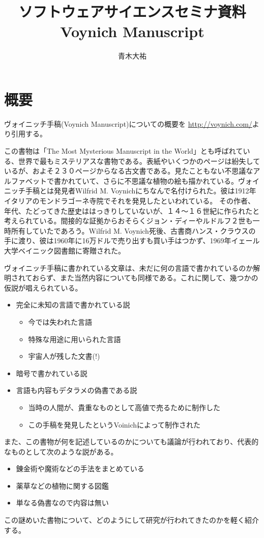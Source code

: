 \documentclass[a4paper,7pt]{jsarticle}
\author{青木大祐}
\title{ソフトウェアサイエンスセミナ資料 \\ Voynich Manuscript}
\begin{document}
\maketitle
\section{概要}

ヴォイニッチ手稿(Voynich Manuscript)についての概要を
\url{http://voynich.com/}より引用する。
\begin{screen}
 この書物は「The Most Mysterious Manuscript in the World」とも呼ばれている、世界で最もミステリアスな書物である。表紙やいくつかのページは紛失しているが、およそ２３０ページからなる古文書である。見たこともない不思議なアルファベットで書かれていて、さらに不思議な植物の絵も描かれている。ヴォイニッチ手稿とは発見者Wilfrid M. Voynichにちなんで名付けられた。彼は1912年イタリアのモンドラゴーネ寺院でそれを発見したといわれている。 その作者、年代、たどってきた歴史ははっきりしていないが、１４～１６世紀に作られたと考えられている。間接的な証拠からおそらくジョン・ディーやルドルフ２世も一時所有していたであろう。Wilfrid M. Voynich死後、古書商ハンス・クラウスの手に渡り、彼は1960年に16万ドルで売り出すも買い手はつかず、1969年イェール大学ベイニック図書館に寄贈された。 
\end{screen}
ヴォイニッチ手稿に書かれている文章は、未だに何の言語で書かれているのか解
明されておらず、また当然内容についても同様である。これに関して、幾つかの
仮説が唱えられている。
\begin{itemize}
 \item 完全に未知の言語で書かれている説
       \begin{itemize}
        \item 今では失われた言語
        \item 特殊な用途に用いられた言語
        \item 宇宙人が残した文書(!)
       \end{itemize}
 \item 暗号で書かれている説
 \item 言語も内容もデタラメの偽書である説
       \begin{itemize}
        \item 当時の人間が、貴重なものとして高値で売るために制作した
        \item この手稿を発見したというVoinichによって制作された
       \end{itemize}
\end{itemize}
また、この書物が何を記述しているのかについても議論が行われており、代表的
なものとして次のような説がある。
\begin{itemize}
 \item 錬金術や魔術などの手法をまとめている
 \item 薬草などの植物に関する図鑑
 \item 単なる偽書なので内容は無い
\end{itemize}
この謎めいた書物について、どのようにして研究が行われてきたのかを軽く紹介
する。
\end{document}
